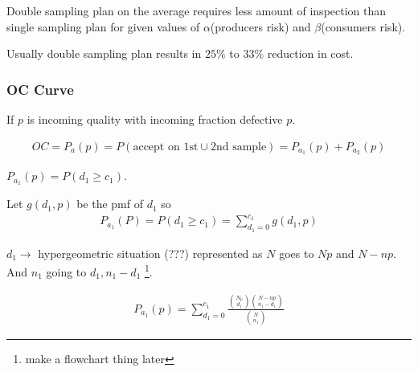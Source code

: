 \documentclass[oneside,11pt,pdftex]{book}%
\numberwithin{equation}{section}
\numberwithin{section}{chapter}
\numberwithin{equation}{chapter}
\begin{document}
Double sampling plan on the average requires less amount of inspection than single sampling plan for given values of $ \alpha $(producers risk) and $ \beta  $(consumers risk).

Usually double sampling plan results in $ 25\% $ to $ 33\% $ reduction in cost.

\subsubsection{OC Curve}
If $ p $ is incoming quality with incoming fraction defective $ p $. 

\begin{align}
	OC=P_a(p) = P(\text{accept on 1st} \cup \text{2nd sample})=P_{a_1}(p)+P_{a_2}(p)
\end{align}

$ P_{a_1}(p)=P(d_1\geq c_1) $. 

Let $ g(d_1,p) $ be the pmf of $ d_1 $ so  
\begin{align}
	P_{a_1} (P)=P(d_1\geq c_1)=\sum_{d_1=0}^{c_1}g(d_1,p)
\end{align}

$ d_1 \rightarrow  $ hypergeometric situation (???) represented as $ N $ goes to $ Np $ and $ N-np $. And $ n_1 $ going to $ d_1, n_1-d_1 $ \footnote{make a flowchart thing later}.

\begin{align} 
	P_{a_1} (p)= \sum_{d_1=0}^{c_1} \frac{\binom{N_p}{d_1}\binom{N-np}{n_1-d_1}}{\binom{N}{n_1}}
\end{align}


\backmatter
\end{document}
